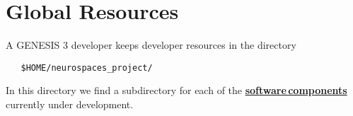 \documentclass[12pt]{article}
\begin{document}



\section*{Global Resources}

A GENESIS 3 developer keeps developer resources in the directory

\begin{verbatim}
   $HOME/neurospaces_project/
\end{verbatim}

In this directory we find a subdirectory for each of the
\href{../genesis-components/genesis-components.tex}{\bf software\,components} currently under development.
\end{document}
